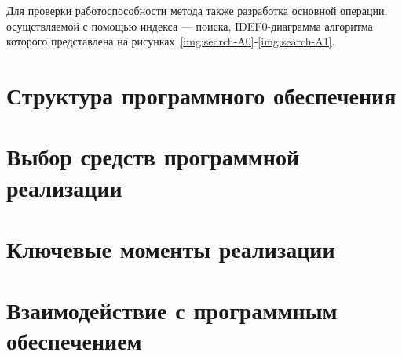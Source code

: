 
Для проверки работоспособности метода также разработка основной операции,
осущствляемой с помощью индекса --- поиска, IDEF0-диаграмма алгоритма которого
представлена на рисунках~\ref{img:search-A0}-\ref{img:search-A1}.


\section{Структура программного обеспечения}

\section{Выбор средств программной реализации}

\section{Ключевые моменты реализации}

\section{Взаимодействие с программным обеспечением}
